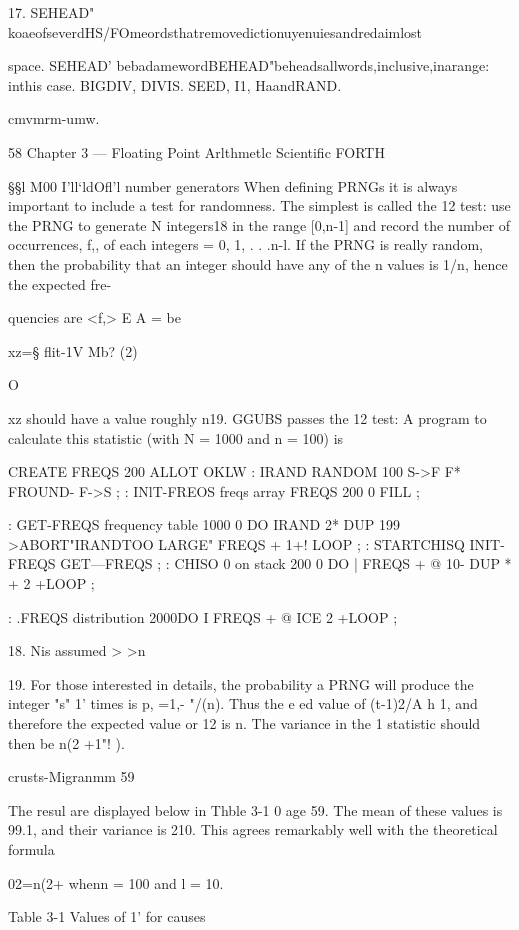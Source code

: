 17. SEHEAD" koaeofseverdHS/FOmeordsthatremovedictionuyenuiesandredaimlost

space. SEHEAD' bebadamewordBEHEAD"beheadsallwords,inclusive,inarange: inthis
case. BIGDIV, DIVIS. SEED, I1, HaandRAND.

cmvmrm-umw.

58 Chapter 3 — Floating Point Arlthmetlc Scientific FORTH

§§l M00 I'll‘ldOfl'l number generators
When defining PRNGs it is always important to include a test
for randomness. The simplest is called the 12 test: use the
PRNG to generate N integers18 in the range [0,n-1] and record
the number of occurrences, f,, of each integers = 0, 1, . . .n-l. If
the PRNG is really random, then the probability that an integer
should have any of the n values is 1/n, hence the expected fre-

quencies are <f,> E A = %
be

xz=§ ﬂit-1V Mb? (2)

O

xz should have a value roughly n19. GGUBS passes the 12 test: A
program to calculate this statistic (with N = 1000 and n = 100) is

CREATE FREQS 200 ALLOT OKLW
: IRAND RANDOM 100 S->F
F* FROUND- F->S ;
: INlT-FREOS \initialize freqs array
FREQS 200 0 FILL ;

: GET-FREQS \make frequency table
1000 0 DO IRAND 2*
DUP 199 >ABORT"IRANDTOO LARGE"
FREQS + 1+!
LOOP ;
: STARTCHISQ INIT-FREQS GET—FREQS ;
: CHISO 0 \sum on stack
200 0 DO | FREQS + @
10- DUP * +
2 +LOOP ;

: .FREQS \display distribution
2000DO I FREQS + @ ICE
2 +LOOP ;

 

18. Nis assumed > >n

19. For those interested in details, the probability a PRNG will produce the integer "s" 1' times is
p, =1,- "/(n). Thus the e ed value of (t-1)2/A h 1, and therefore the expected value or 12
is n. The variance in the 1 statistic should then be n(2 +1"! ).

crusts-Migranmm 59

The resul are displayed below in Thble 3-1 0 age 59. The mean
of these values is 99.1, and their variance is 210. This agrees
remarkably well with the theoretical formula

02=n(2+%
whenn = 100 and l = 10.

Table 3-1 Values of 1' for causes

